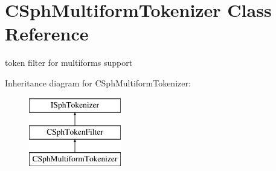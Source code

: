 \hypertarget{classCSphMultiformTokenizer}{\section{C\-Sph\-Multiform\-Tokenizer Class Reference}
\label{classCSphMultiformTokenizer}
}


token filter for multiforms support  


Inheritance diagram for C\-Sph\-Multiform\-Tokenizer\-:\begin{figure}[H]
\begin{center}
\leavevmode
\includegraphics[height=3.000000cm]{classCSphMultiformTokenizer}
\end{center}
\end{figure}
